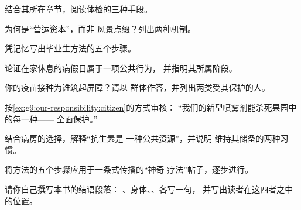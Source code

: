 \begin{exercise}[$\star$]\label{exo:g9:our-responsibility:4}
结合其所在章节，阅读体检的三种手段。
\end{exercise}

\begin{exercise}[$\star$]\label{exo:g9:our-responsibility:5}
为何是“营运资本”，而非
风景点缀？列出两种机制。
\end{exercise}

\begin{exercise}[$\star$]\label{exo:g9:our-responsibility:6}
凭记忆写出毕业生方法的五个步骤。
\end{exercise}

\begin{exercise}[$\star\star$]\label{exo:g9:our-responsibility:7}
论证在家休息的病假日属于一项公共行为，
并指明其所属阶段。
\end{exercise}

\begin{exercise}[$\star\star$]\label{exo:g9:our-responsibility:8}
你的疫苗接种为谁筑起屏障？请以
群体作答，并列出两类受其保护的人。
\end{exercise}

\begin{exercise}[$\star\star$]\label{exo:g9:our-responsibility:9}
按\cref{ex:g9:our-responsibility:citizen}的方式审核：
“我们的新型喷雾剂能杀死果园中的每一种——
全面保护。”
\end{exercise}

\begin{exercise}[$\star\star$]\label{exo:g9:our-responsibility:10}
结合病房的选择，解释“抗生素是
一种公共资源”，并说明
维持其储备的两种习惯。
\end{exercise}

\begin{exercise}[$\star\star$]\label{exo:g9:our-responsibility:11}
将方法的五个步骤应用于一条式传播的“神奇
疗法”帖子，逐步进行。
\end{exercise}

\begin{exercise}[$\star\star\star$]\label{exo:g9:our-responsibility:12}
请你自己撰写本书的结语段落：
、身体、、各写一句，
并写出读者在这四者之中的位置。
\end{exercise}

